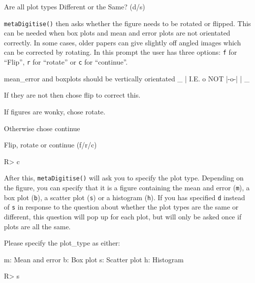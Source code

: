 \documentclass[12pt]{article}
\newcommand{\code}[1]{\texttt{#1}}
\newcommand{\fct}[1]{\texttt{#1()}}
\begin{document}
\begin{CodeChunk}
\begin{CodeOutput}
Are all plot types Different or the Same? (d/s)
\end{CodeOutput}
\end{CodeChunk}

\fct{metaDigitise} then asks whether the figure needs to be rotated or flipped. This can be needed when box plots and mean and error plots are not orientated correctly. In some cases, older papers can give slightly off angled images which can be corrected by rotating. In this prompt the user has three options: \code{f} for ``Flip'', \code{r} for ``rotate'' or \code{c} for ``continue''. 

\begin{CodeChunk}
\begin{CodeOutput}
mean_error and boxplots should be vertically orientated
       _ 
       |  
  I.E. o    NOT  |-o-|
       |
       _

If they are not then chose flip to correct this.

If figures are wonky, chose rotate.

Otherwise chose continue

Flip, rotate or continue (f/r/c) 
\end{CodeOutput}
\begin{CodeInput}
R> c
\end{CodeInput}
\end{CodeChunk}

After this, \fct{metaDigitise} will ask you to specify the plot type. Depending on the figure, you can specify that it is a figure containing the mean and error (\code{m}), a box plot (\code{b}), a scatter plot (\code{s}) or a histogram (\code{h}). If you has specified \code{d} instead of \code{s} in response to the question about whether the plot types are the same or different, this question will pop up for each plot, but will only be asked once if plots are all the same.

\begin{CodeChunk}
\begin{CodeOutput}
Please specify the plot_type as either:

 m: Mean and error
 b: Box plot
 s: Scatter plot 
 h: Histogram
\end{CodeOutput}
\begin{CodeInput}
R> s
\end{CodeInput}
\end{CodeChunk}
\end{document}
